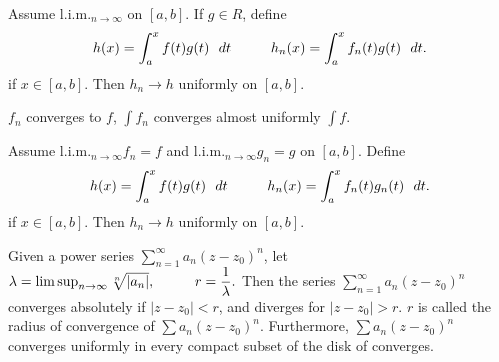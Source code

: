 \documentclass[10pt,a4paper]{book}
\begin{document}
\begin{Thm}
Assume $\mathrm{l.i.m.}_{n\to \infty}$ on $[a,b].$ If $g \in R$, define
$$h(x) = \int_a^x f(t)g(t)\ \ dt \sp h_n(x) = \int_a^x f_n(t)g(t)\ \ dt.$$
if $x \in [a,b]$. Then $h_n \rightarrow h$ uniformly on $[a,b]$.
\end{Thm}
\PP $f_n$ converges to $f$, $\int f_n$ converges almost uniformly $\int f.$
\begin{Thm}
Assume $\mathrm{l.i.m.}_{n\to \infty} f_n = f$  and $\mathrm{l.i.m.}_{n\to \infty} g_n = g $ on $[a,b].$ Define
$$h(x) = \int_a^x f(t)g(t)\ \ dt \sp h_n(x) = \int_a^x f_n(t)g_n(t)\ \ dt.$$
if $x \in [a,b]$. Then $h_n \rightarrow h$ uniformly on $[a,b]$.
\end{Thm}
\begin{Thm}
Given a power series $\sum_{n=1}^{\infty} a_n(z-z_0)^n$, let
$\lambda = \limsup_{n \to \infty}{\sqrt[n]{|a_n|}}, \sp r = \dfrac{1}{\lambda}.$
Then the series $\sum_{n=1}^{\infty} a_n(z-z_0)^n$ converges absolutely if $|z-z_0| < r$, and diverges for $|z-z_0|>r$.   $r$ is called the radius of convergence of $\sum a_n(z-z_0)^n.$ Furthermore, $\sum a_n(z-z_0)^n$ converges uniformly in every compact subset of the disk of converges.
\end{Thm}
\end{document}
